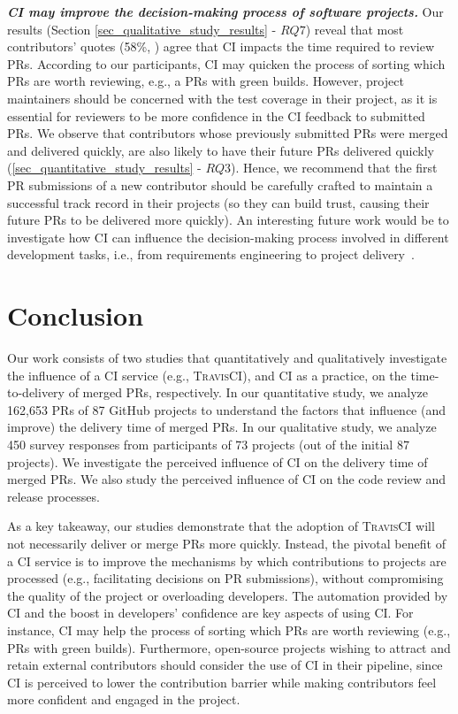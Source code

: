 {\em\bfseries CI may improve the decision-making process of software projects.} Our results (Section \ref{sec_qualitative_study_results} - $RQ7$) reveal that most contributors' quotes (58\%, ) agree that CI impacts the time required to review PRs. According to our participants, CI may quicken the process of sorting which PRs are worth reviewing, e.g., a PRs with green builds. However, project maintainers should be concerned with the test coverage in their project, as it is essential for reviewers to be more confidence in the CI feedback to submitted PRs. We observe that contributors whose previously submitted PRs were merged and delivered quickly, are also likely to have their future PRs delivered quickly (\ref{sec_quantitative_study_results} - $RQ3$).  Hence, we recommend that the first PR submissions of a new contributor should be carefully crafted to maintain a successful track record in their projects (so they can build trust, causing their future PRs to be delivered more quickly).
An interesting future work would be to investigate how CI can influence the decision-making process involved in different development tasks, i.e., from requirements engineering to project delivery~\citep{Sharma2021influence}. 


\section{Conclusion}
\label{sec_conclusions}

Our work consists of two studies that quantitatively and qualitatively investigate the influence of a CI service (e.g., \textsc{TravisCI}), and CI as a practice, on the time-to-delivery of merged PRs, respectively. In our quantitative study, we analyze 162,653 PRs of 87 GitHub projects to understand the factors that influence (and improve) the delivery time of merged PRs. In our qualitative study, we analyze 450 survey responses from participants of 73 projects (out of the initial 87 projects). We investigate the perceived influence of CI on the delivery time of merged PRs. We also study the perceived influence of CI on the code review and release processes.

As a key takeaway, our studies demonstrate that the adoption of \textsc{TravisCI}
will not necessarily deliver or merge PRs more quickly. Instead, the pivotal benefit of a CI service is to improve the mechanisms by which contributions to projects are processed (e.g., facilitating decisions on PR submissions), without compromising the quality of the project or overloading developers. The automation provided by CI and the boost in developers' confidence are key aspects of using CI. For instance, CI may help the process of sorting which PRs are worth reviewing (e.g., PRs with green builds).
Furthermore, open-source projects wishing to attract and retain external contributors should consider the use of CI in their pipeline, since CI is perceived to lower the contribution barrier while making contributors feel more confident and engaged in the project.

